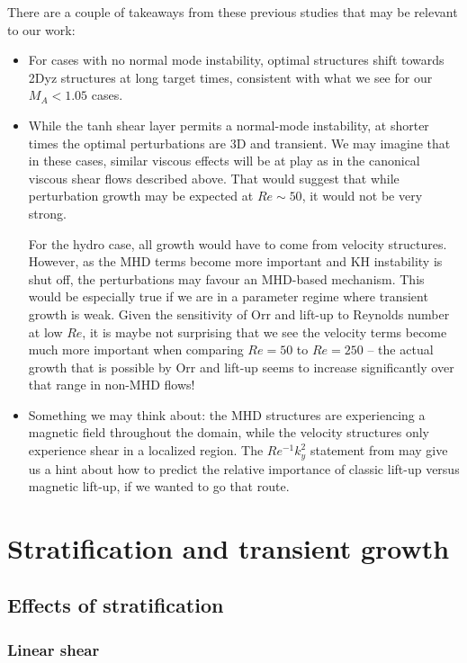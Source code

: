 \documentclass{article}
\begin{document}
There are a couple of takeaways from these previous studies that may be relevant to our work:
\begin{itemize}
	\item For cases with no normal mode instability, optimal structures shift towards 2Dyz structures at long target times, consistent with what we see for our $M_A<1.05$ cases. 
	\item While the tanh shear layer permits a normal-mode instability, at shorter times the optimal perturbations are 3D and transient. We may imagine that in these cases, similar viscous effects will be at play as in the canonical viscous shear flows described above. That would suggest that while perturbation growth may be expected at $Re\sim50$, it would not be very strong. 
	
	For the hydro case, all growth would have to come from velocity structures. However, as the MHD terms become more important and KH instability is shut off, the perturbations may favour an MHD-based mechanism. This would be especially true if we are in a parameter regime where transient growth is weak. Given the sensitivity of Orr and lift-up to Reynolds number at low $Re$, it is maybe not surprising that we see the velocity terms become much more important when comparing $Re=50$ to $Re=250$ -- the actual growth that is possible by Orr and lift-up seems to increase significantly over that range in non-MHD flows!
	
	\item Something we may think about: the MHD structures are experiencing a magnetic field throughout the domain, while the velocity structures only experience shear in a localized region. The $Re^{-1}k_y^2$ statement from \citet{Arratia2013b} may give us a hint about how to predict the relative importance of classic lift-up versus magnetic lift-up, if we wanted to go that route. 
\end{itemize}

\section{Stratification and transient growth}

\subsection{Effects of stratification}

\subsubsection{Linear shear}
\end{document}
